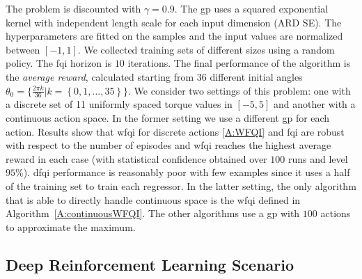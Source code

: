 The problem is discounted with $\gamma = 0.9$.
The \gls{gp} uses a squared exponential kernel with independent length scale for each input dimension (ARD SE). The hyperparameters are fitted on the samples and the input values are normalized between $[-1,1]$.
We collected training sets of different sizes using a random policy.
The \gls{fqi} horizon is $10$ iterations.
The final performance of the algorithm is the \emph{average reward}, calculated starting from $36$ different initial angles $\theta_0 = \lbrace \frac{2\pi k}{36} | k=\left\{0, 1, \ldots, 35\right\}\rbrace$.
We consider two settings of this problem: one with a discrete set of 11 uniformly spaced torque values in $[-5,5]$ and another with a continuous action space.
In the former setting we use a different \gls{gp} for each action.
Results show that \gls{wfqi} for discrete actions \ref{A:WFQI} and \gls{fqi} are robust with respect to the number of episodes and \gls{wfqi} reaches the highest average reward in each case (with statistical confidence obtained over $100$ runs and level $95\%$).
\gls{dfqi} performance is reasonably poor with few examples since it uses a half of the training set to train each regressor.
In the latter setting, the only algorithm that is able to directly handle continuous space is the \gls{wfqi} defined in Algorithm~\ref{A:continuousWFQI}.
The other algorithms use a \gls{gp} with $100$ actions to approximate the maximum.

\subsection{Deep Reinforcement Learning Scenario}
